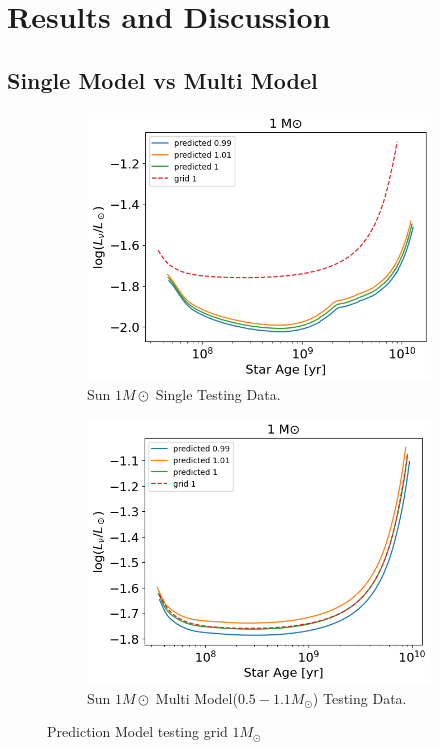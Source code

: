 \section{Results and Discussion}

\subsection{Single Model vs Multi Model}
\begin{figure}[H]
	\centering
	\begin{subfigure}{\textwidth}
		\includegraphics[width=\textwidth,height=0.5\textheight]{assets/output1singlemodel.png}
		\caption{Sun $1M\odot$ Single Testing Data.}
		\label{fig:SunTesta}	
	\end{subfigure}
	\begin{subfigure}{\textwidth}
		\includegraphics[width=\textwidth,height=0.5\textheight]{assets/output1.png}
		\caption{Sun $1M\odot$ Multi Model($0.5-1.1M_\odot$) Testing Data.}
		\label{fig:SunTestb}	
	\end{subfigure}
	\caption{Prediction Model testing grid $1M_\odot$}
	\label{fig:SunTest}
\end{figure}


